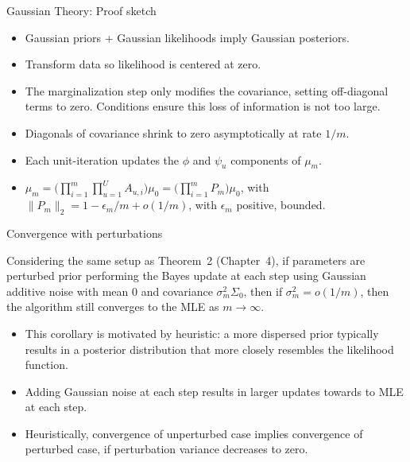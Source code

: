 \documentclass[aspectratio=169]{beamer}\usepackage[]{graphicx}\usepackage[]{xcolor}
\begin{document}
\begin{frame}{Gaussian Theory: Proof sketch}

\begin{itemize}
  \item Gaussian priors + Gaussian likelihoods imply Gaussian posteriors.
  \item Transform data so likelihood is centered at zero.
  \item The marginalization step only modifies the covariance, setting off-diagonal terms to zero. Conditions ensure this loss of information is not too large.
  \item Diagonals of covariance shrink to zero asymptotically at rate $1/m$.
  \item Each unit-iteration updates the $\phi$ and $\psi_u$ components of $\mu_m$.
  \item $\mu_m = \big(\prod_{i = 1}^m\prod_{u = 1}^U A_{u, i}\big) \mu_0 = \big(\prod_{i = 1}^m P_m\big) \mu_0$, with $\|P_m\|_2 = 1 - \epsilon_m/m + o(1/m)$, with $\epsilon_m$ positive, bounded.
\end{itemize}

\end{frame}

\begin{frame}{Convergence with perturbations}

    \begin{theorem}
    Considering the same setup as Theorem~2 (Chapter~4), if parameters are perturbed prior performing the Bayes update at each step using Gaussian additive noise with mean $0$ and covariance $\sigma^2_m\Sigma_0$, then if $\sigma_m^2 = o(1/m)$, then the algorithm still converges to the MLE as $m\rightarrow \infty$. 
  \end{theorem}
  
  \begin{itemize}
    \item This corollary is motivated by heuristic: a more dispersed prior typically results in a posterior distribution that more closely resembles the likelihood function.
    \item Adding Gaussian noise at each step results in larger updates towards to MLE at each step.
    \item Heuristically, convergence of unperturbed case implies convergence of perturbed case, if perturbation variance decreases to zero.
  \end{itemize}

\end{frame}
\end{document}
